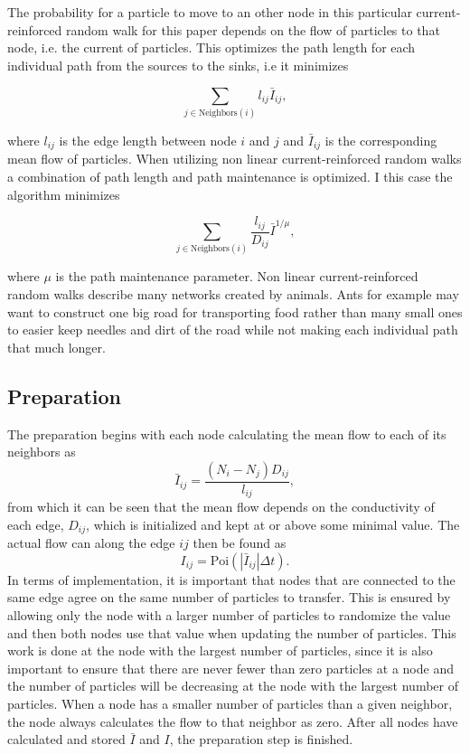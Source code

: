 The probability for a particle to move to an other node in this particular current-reinforced random walk for this paper depends on the flow of particles to that node, i.e. the current of particles. This optimizes the path length for each individual path from the sources to the sinks, i.e it minimizes 

\begin{equation}
\sum_{j \in \text{Neighbors}(i)} l_{ij} \bar{I}_{ij},
\end{equation}

\noindent where $l_{ij}$ is the edge length between node $i$ and $j$ and $\bar{I}_{ij}$ is the corresponding mean flow of particles. When utilizing non linear current-reinforced random walks a combination of path length and path maintenance is optimized. I this case the algorithm minimizes

\begin{equation}
\sum_{j \in \text{Neighbors}(i)}\frac{l_{ij}}{D_{ij}}\bar{I}^{1/\mu},
\end{equation}

\noindent where $\mu$ is the path maintenance parameter. Non linear current-reinforced random walks describe many networks created by animals. Ants for example may want to construct one big road for transporting food rather than many small ones to easier keep needles and dirt of the road while not making each individual path that much longer.


\subsection{Preparation}
The preparation begins with each node calculating the mean flow to each of its neighbors as
\begin{equation}
\bar{I}_{ij} = \frac{(N_i - N_j)D_{ij}}{l_{ij}},
\end{equation}
from which it can be seen that the mean flow depends on the conductivity of each edge, $D_{ij}$, which is initialized and kept at or above some minimal value.
The actual flow can along the edge $ij$ then be found as
\begin{equation}
I_{ij} = \text{Poi}(|\bar{I}_{ij}|\Delta t).
\end{equation}
In terms of implementation, it is important that nodes that are connected to the same edge agree on the same number of particles to transfer. This is ensured by allowing only the node with a larger number of particles to randomize the value and then both nodes use that value when updating the number of particles. This work is done at the node with the largest number of particles, since it is also important to ensure that there are never fewer than zero particles at a node and the number of particles will be decreasing at the node with the largest number of particles. When a node has a smaller number of particles than a given neighbor, the node always calculates the flow to that neighbor as zero. After all nodes have calculated and stored $\bar{I}$ and $I$, the preparation step is finished.

